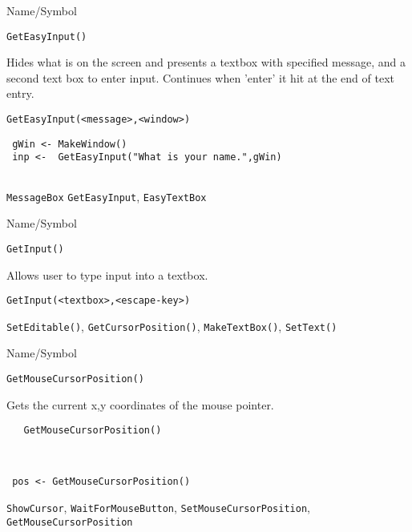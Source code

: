 \begin{desc}{Name/Symbol}
\item[Name/Symbol]	\verb+GetEasyInput()+

\item[Description]	Hides what is on the screen and presents a textbox with
  specified message, and a second text box to enter input.  Continues
  when 'enter' it hit at the end of text entry.

\item[Usage]		
\begin{verbatim}
GetEasyInput(<message>,<window>)
\end{verbatim}

\item[Example]	
\begin{verbatim}
 gWin <- MakeWindow()
 inp <-  GetEasyInput("What is your name.",gWin)


\end{verbatim}

\item[See Also]\verb+MessageBox+	\verb+GetEasyInput+, \verb+EasyTextBox+
\end{desc}

\begin{desc}{Name/Symbol}
\item[Name/Symbol]	\verb+GetInput()+

\item[Description]	Allows user to type input into a textbox.

\item[Usage]
\begin{verbatim}
GetInput(<textbox>,<escape-key>)
\end{verbatim}

\item[Example]	

\item[See Also]	\verb+SetEditable()+, \verb+GetCursorPosition()+, \verb+MakeTextBox()+, \verb+SetText()+
\end{desc}
\begin{desc}{Name/Symbol}
\item[Name/Symbol]	\verb+GetMouseCursorPosition()+

\item[Description] Gets the current x,y coordinates of the mouse
  pointer.

\item[Usage]
\begin{verbatim}
   GetMouseCursorPosition()
\end{verbatim}

\item[Example]	
\begin{verbatim}


 pos <- GetMouseCursorPosition()
\end{verbatim}


\item[See Also]
  \verb+ShowCursor+, \verb+WaitForMouseButton+,
  \verb+SetMouseCursorPosition+, \verb+GetMouseCursorPosition+
\end{desc}

